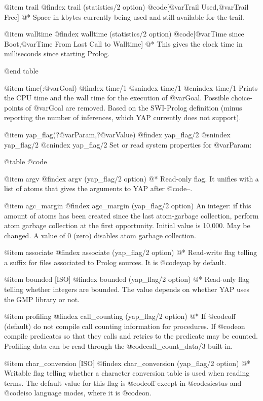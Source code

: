 {{{{{{@item trail
@findex trail (statistics/2 option)
@code{[@var{Trail Used},@var{Trail Free}]}
@*
Space in kbytes currently being used and still available for the trail.

@item walltime
@findex walltime (statistics/2 option)
@code{[@var{Time since Boot},@var{Time From Last Call to Walltime}]}
@* 
This gives the clock time in milliseconds since starting Prolog.

@end table

@item time(:@var{Goal})
@findex time/1
@snindex time/1
@cnindex time/1
Prints the CPU time and the wall time for the execution of @var{Goal}.
Possible choice-points of @var{Goal} are removed. Based on the SWI-Prolog 
definition (minus reporting the number of inferences, which YAP currently
does not support).

@item yap_flag(?@var{Param},?@var{Value})
@findex yap_flag/2
@snindex yap_flag/2
@cnindex yap_flag/2
Set or read system properties for @var{Param}:

@table @code

@item argv
@findex argv (yap_flag/2 option)
@* Read-only flag. It unifies with a list of atoms that gives the
arguments to YAP after @code{--}.

@item agc_margin
@findex agc_margin (yap_flag/2 option)
An integer: if this amount of atoms has been created since the last
atom-garbage collection, perform atom garbage collection at the first
opportunity. Initial value is 10,000. May be changed. A value of 0
(zero) disables atom garbage collection.

@item associate
@findex associate (yap_flag/2 option)
@*
Read-write flag telling a suffix for files associated to Prolog
sources. It is @code{yap} by default.

@item bounded [ISO]
@findex bounded (yap_flag/2 option)
@*
Read-only flag telling whether integers are bounded. The value depends
on whether YAP uses the GMP library or not.

@item  profiling
@findex call_counting (yap_flag/2 option)
@*
If @code{off} (default) do not compile call counting information for
procedures. If @code{on} compile predicates so that they calls and
retries to the predicate may be counted. Profiling data can be read through the
@code{call_count_data/3} built-in.

@item char_conversion [ISO]
@findex  char_conversion (yap_flag/2 option)
@*
Writable flag telling whether a character conversion table is used when
reading terms. The default value for this flag is @code{off} except in
@code{sicstus} and @code{iso} language modes, where it is @code{on}.

}}}}}}
